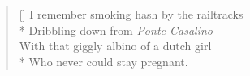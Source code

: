 \settowidth{\versewidth}{I remember smoking hash by the railtracks}
\begin{verse}[\versewidth]
I remember smoking hash by the railtracks\\*
\vin Dribbling down from \textit{Ponte Casalino}\\
With that giggly albino of a dutch girl\\*
\vin Who never could stay pregnant.
\end{verse}
